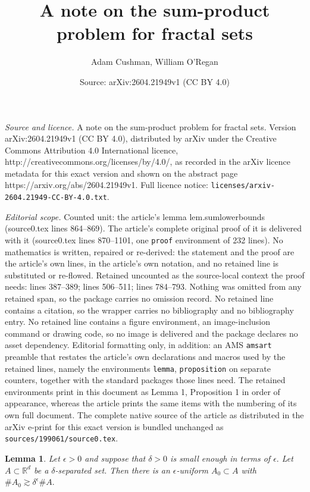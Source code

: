 \documentclass[10pt,a4paper]{amsart}
\title{A note on the sum-product problem for fractal sets}
\author{Adam Cushman, William O'Regan}
\date{Source: arXiv:2604.21949v1 (CC BY 4.0)}
\newtheorem{lemma}{Lemma}
\newcommand{\R}{\mathbb{R}}\newcommand{\C}{\mathbb{C}}
\newcommand{\e}{\epsilon}
\begin{document}
\maketitle

\noindent\emph{Source and licence.} A note on the sum-product problem for fractal sets. Version arXiv:2604.21949v1 (CC BY 4.0), distributed by arXiv under the Creative Commons Attribution 4.0 International licence, http://creativecommons.org/licenses/by/4.0/, as recorded in the arXiv licence metadata for this exact version and shown on the abstract page https://arxiv.org/abs/2604.21949v1. Full licence notice: \texttt{licenses/arxiv-2604.21949-CC-BY-4.0.txt}.\par\smallskip

\noindent\textit{Editorial scope.} Counted unit: the article's lemma lem.sumlowerbounds (source0.tex lines 864--869). The article's complete original proof of it is delivered with it (source0.tex lines 870--1101, one \texttt{proof} environment of 232 lines). No mathematics is written, repaired or re-derived: the statement and the proof are the article's own lines, in the article's own notation, and no retained line is substituted or re-flowed.  Retained uncounted as the source-local context the proof needs: lines 387--389; lines 506--511; lines 784--793.  Nothing was omitted from any retained span, so the package carries no omission record.  No retained line contains a citation, so the wrapper carries no bibliography and no bibliography entry.  No retained line contains a figure environment, an image-inclusion command or drawing code, so no image is delivered and the package declares no asset dependency.  Editorial formatting only, in addition: an AMS \texttt{amsart} preamble that restates the article's own declarations and macros used by the retained lines, namely the environments \texttt{lemma}, \texttt{proposition} on separate counters, together with the standard packages those lines need.  The retained environments print in this document as Lemma 1, Proposition 1 in order of appearance, whereas the article prints the same items with the numbering of its own full document.  The complete native source of the article as distributed in the arXiv e-print for this exact version is bundled unchanged as \texttt{sources/199061/source0.tex}.
	\begin{lemma}\label{lem.unifsubset}
		Let $\epsilon > 0$ and suppose that $\delta >0 $ is small enough in terms of $\e.$ Let $A \subset \R^d$ be a $\delta$-separated set. Then there is an $\e$-uniform $A_0 \subset A$ with $\#A_0 \gtrsim \delta^{\epsilon}\#A.$ 
	\end{lemma}
\end{document}
